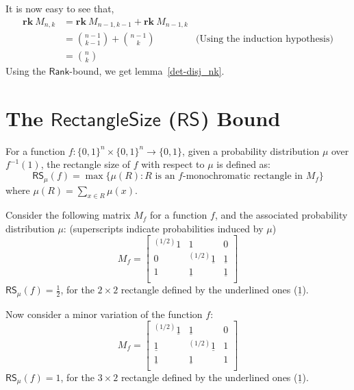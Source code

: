 \documentclass[usletter]{article}
\newcommand {\complexity}[1] {\ensuremath{\mathsf{#1}}}
\newcommand {\RS}[1]         {\ensuremath{\complexity{RS}_{#1}}}
\newcommand {\rank}     {\ensuremath{\mathbf{rk}}\ }
\newcommand {\bit}       {\ensuremath{\{0,1\}}}
\begin{document}
\noindent
It is now easy to see that,
\begin{align*}
    \rank M_{n,k} &= \rank M_{n-1,k-1} + \rank M_{n-1,k} \\
                  &= \binom{n-1}{k-1} + \binom{n-1}{k} & \text{(Using the induction hypothesis)} \\
                  &= \binom{n}{k}
\end{align*}
Using the \complexity{Rank}-bound, we get lemma~\ref{det-disj_nk}.

\clearpage

\section{The \complexity{RectangleSize} (\RS{}) Bound}

\begin{definition}
For a function $f : \bit^n \times \bit^n \rightarrow \bit$, given a probability distribution $\mu$ over $f^{-1}(1)$, the rectangle size of $f$ with respect to $\mu$ is defined as:
$$
\RS{\mu}(f) = \max{\{\mu(R) : R \text{ is an $f$-monochromatic rectangle in } M_f\}}
$$
where $\displaystyle \mu(R) = \sum_{x \in R} \mu(x)$.
\end{definition}

\begin{example}
Consider the following matrix $M_f$ for a function $f$, and the associated probability distribution $\mu$: (superscripts indicate probabilities induced by $\mu$)
{\large $$
M_f = \begin{bmatrix}
        ^{(1/2)}1 & 1         & 0 \\
        0         & ^{(1/2)}\underline{1} & \underline{1} \\
        1         & \underline{1}         & \underline{1} \\
      \end{bmatrix}
$$
}
$\RS{\mu}(f) = \frac{1}{2}$, for the $2\times2$ rectangle defined by the underlined ones ($\underline{1}$).
\end{example}

\begin{example}
Now consider a minor variation of the function $f$:
{\large $$
M_f = \begin{bmatrix}
        ^{(1/2)}\underline{1} & \underline{1} & 0 \\
        \underline{1} & ^{(1/2)}\underline{1} & 1 \\
        \underline{1} & \underline{1}         & 1 \\
      \end{bmatrix}
$$
}
$\RS{\mu}(f) = 1$, for the $3\times2$ rectangle defined by the underlined ones ($\underline{1}$).
\end{example}
\end{document}
